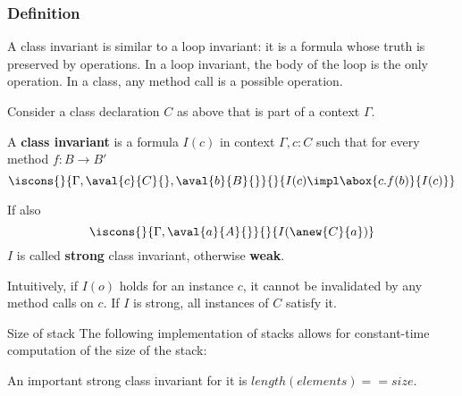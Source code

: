 \subsubsection{Definition}

A class invariant is similar to a loop invariant: it is a formula whose truth is preserved by operations.
In a loop invariant, the body of the loop is the only operation.
In a class, any method call is a possible operation.

\begin{definition}
Consider a class declaration $C$ as above that is part of a context $\Gamma$.

A \textbf{class invariant} is a formula $I(c)$ in context $\Gamma,c:C$ such that
for every method $f:B\to B'$
\[\iscons{}{\Gamma,\aval{c}{C}{},\aval{b}{B}{}}{}{I(c)\impl \abox{c.f(b)}{I(c)}}\]

If also
\[\iscons{}{\Gamma,\aval{a}{A}{}}{}{I(\anew{C}{a})}\]
$I$ is called \textbf{strong} class invariant, otherwise \textbf{weak}.
\end{definition}

Intuitively, if $I(o)$ holds for an instance $c$, it cannot be invalidated by any method calls on $c$.
If $I$ is strong, all instances of $C$ satisfy it.

\begin{example}{Size of stack}
The following implementation of stacks allows for constant-time computation of the size of the stack:
\begin{acode}
\end{acode}

An important strong class invariant for it is $length(elements)==size$.
\end{example}

